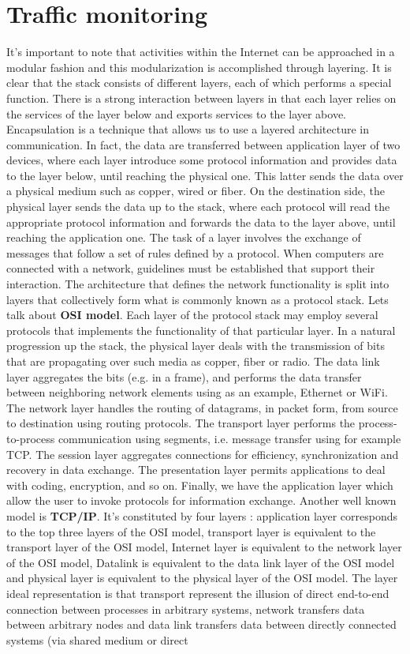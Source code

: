 \documentclass[11pt]{article}
\begin{document}
\section{Traffic monitoring}
It's important to note that activities within the Internet can be approached in a modular fashion and this modularization is accomplished through layering. It is clear that the stack consists of different layers, each of which performs a special function. There is a strong interaction between layers in that each layer relies on the services of the layer below and exports services to the layer above. Encapsulation is a technique that allows us to use a layered architecture in communication. In fact, the data are transferred between application layer of two devices, where each layer introduce some protocol information and provides data to the layer below, until reaching the physical one. This latter sends the data over a physical medium such as copper, wired or fiber. On the destination side, the physical layer sends the data up to the stack, where each protocol will read the appropriate protocol information and forwards the data to the layer above, until reaching the application one. The task of a layer involves the exchange of messages that follow a set of rules defined by a protocol. When computers are connected with a network, guidelines must be established that support their interaction. The architecture that defines the network functionality is split into layers that collectively form what is commonly known as a protocol stack. Lets talk about \textbf{OSI model}. Each layer of the protocol stack may employ several protocols that implements the functionality of that particular layer. In a natural progression up the stack, the physical layer deals with the transmission of bits that are propagating over such media as copper, fiber or radio. The data link layer aggregates the bits (e.g. in a frame), and performs the data transfer between neighboring network elements using as an example, Ethernet or WiFi. The network layer handles the routing of datagrams, in packet form, from source to destination using routing protocols. The transport layer performs the process-to-process communication using segments, i.e. message transfer using for example TCP. The session layer aggregates connections for efficiency, synchronization and recovery in data exchange. The presentation layer permits applications to deal with coding, encryption, and so on. Finally, we have the application layer which allow the user to invoke protocols for information exchange. Another well known model is \textbf{TCP/IP}. It's constituted by four layers : application layer  corresponds to the top three layers of the OSI model, transport layer is equivalent to the transport layer of the OSI model, Internet layer is equivalent to the network layer of the OSI model, Datalink is equivalent to the data link layer of the OSI model and physical layer is equivalent to the physical layer of the OSI model. The layer ideal representation is that transport represent the illusion of direct end-to-end connection between processes in arbitrary systems, network transfers data between arbitrary nodes and data link transfers data between directly connected systems (via shared medium or direct 
\end{document}

